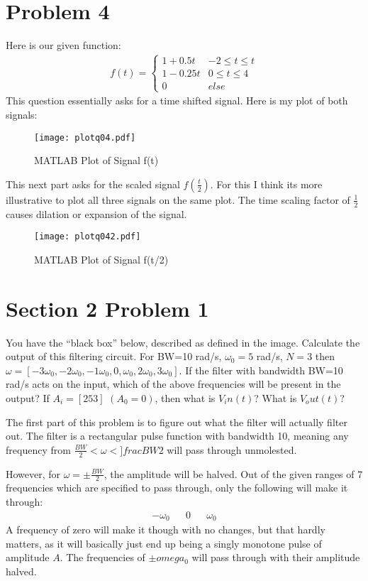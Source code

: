 \documentclass{article}
\begin{document}
\section*{Problem 4}
Here is our given function:
\begin{align*}
 f(t) = \begin{cases} 
      1 + 0.5 t & -2\leq t \leq t  \\
      1 - 0.25t & 0\leq t \leq 4 \\
      0 & else 
   \end{cases}
\end{align*}
This question essentially asks for a time shifted signal. Here is my plot of both signals:
\begin{figure}[hbt!]
\centering
\texttt{[image: plotq04.pdf]}
\caption{MATLAB Plot of Signal f(t)}\label{fig:Q41Plot}
\end{figure}

This next part asks for the scaled signal $f(\frac{t}{2})$. For this I think its more illustrative to plot all three signals on the same plot. The time scaling factor of $\frac{1}{2}$ causes dilation or expansion of the signal.

\begin{figure}[hbt!]
\centering
\texttt{[image: plotq042.pdf]}
\caption{MATLAB Plot of Signal f(t/2)}\label{fig:Q42Plot}
\end{figure}
\pagebreak
\section*{Section 2 Problem 1}
You have the “black box” below, described as defined in the image. Calculate the output of this filtering circuit. For BW=10 rad/s, $\omega_0=5$ rad/s, $N=3$ then $ω=[-3\omega_0,-2\omega_0,-1\omega_0,0,\omega_0,2\omega_0,3\omega_0]$. If the filter with bandwidth BW=10 rad/s acts on the input, which of the above frequencies will be present in the output? If $A_i=[2 5 3]$ $(A_0=0)$, then what is $V_in (t)$? What is $V_out(t)$?

The first part of this problem is to figure out what the filter will actually filter out. The filter is a rectangular pulse function with bandwidth 10, meaning any frequency from $\frac{BW}{2}< \omega < ]frac{BW}{2}$ will pass through unmolested.

However, for $\omega = \pm \frac{BW}{2}$, the amplitude will be halved. Out of the given ranges of 7 frequencies which are specified to pass through, only the following will make it through:
\begin{align*}
-\omega_0 && 0 && \omega_0
\end{align*}
A frequency of zero will make it though with no changes, but that hardly matters, as it will basically just end up being a singly monotone pulse of amplitude $A$. The frequencies of $\pm omega_0$ will pass through with their amplitude halved.
\end{document}
